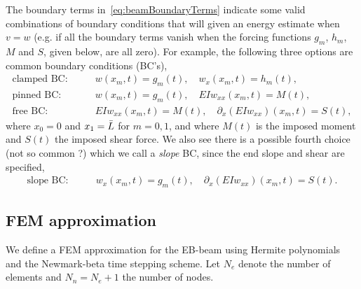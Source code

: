 \documentclass[11pt]{article}
\begin{document}
The boundary terms in~\eqref{eq:beamBoundaryTerms} indicate some valid combinations of boundary conditions that will given an energy estimate
when $v=w$ (e.g. if all the boundary terms vanish when the forcing functions $g_m$, $h_m$, $M$ and $S$, given below, are all zero). 
For example, the following three options are common boundary conditions (BC's), 
\begin{align}
   \text{clamped BC:}\quad & \quad w(x_m,t)=g_m(t),\quad  w_x(x_m,t)=h_m(t),  \\
   \text{pinned BC:} \quad & \quad w(x_m,t)=g_m(t), \quad E I w_{xx}(x_m,t)=M(t), \\
   \text{free BC:}   \quad & \quad  E I w_{xx}(x_m,t)=M(t), \quad \partial_x( E I w_{xx})(x_m,t)=S(t),
\end{align}
where $x_0=0$ and $x_1=\bar{L}$ for $m=0,1$, and 
where $M(t)$ is the imposed moment and $S(t)$ the imposed shear force. 
We also see there is a possible fourth choice (not so common ?) which we call a {\em slope} BC, since
the end slope and shear are specified, 
\begin{align}
   \text{slope BC:}\quad & \quad w_x(x_m,t)=g_m(t),\quad  \partial_x( E I w_{xx})(x_m,t)=S(t). 
\end{align}


\newcommand{\Ne}{N_e}%
\newcommand{\Nn}{N_n}%
\newcommand{\dx}{\Delta x}
\newcommand{\Mt}{\tilde{M}}
\newcommand{\Kt}{\tilde{K}}
\newcommand{\Bc}{\mathcal{B}}
\subsection{FEM approximation}\label{sec:BeamModelFEM}

We define a FEM approximation for the EB-beam using Hermite polynomials and the Newmark-beta time stepping scheme.
Let $\Ne$ denote the number of elements and $\Nn=\Ne+1$ the number of nodes. 
\end{document}
